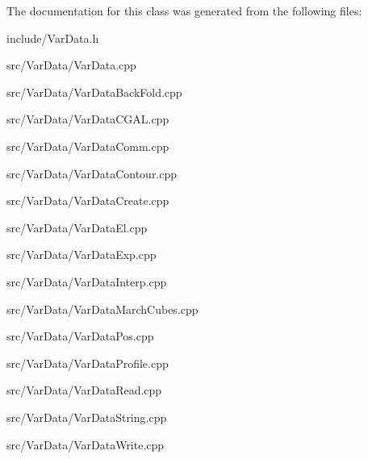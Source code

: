 The documentation for this class was generated from the following files\+:\begin{DoxyCompactItemize}
\item 
include/Var\+Data.\+h\item 
src/\+Var\+Data/Var\+Data.\+cpp\item 
src/\+Var\+Data/Var\+Data\+Back\+Fold.\+cpp\item 
src/\+Var\+Data/Var\+Data\+C\+G\+A\+L.\+cpp\item 
src/\+Var\+Data/Var\+Data\+Comm.\+cpp\item 
src/\+Var\+Data/Var\+Data\+Contour.\+cpp\item 
src/\+Var\+Data/Var\+Data\+Create.\+cpp\item 
src/\+Var\+Data/Var\+Data\+El.\+cpp\item 
src/\+Var\+Data/Var\+Data\+Exp.\+cpp\item 
src/\+Var\+Data/Var\+Data\+Interp.\+cpp\item 
src/\+Var\+Data/Var\+Data\+March\+Cubes.\+cpp\item 
src/\+Var\+Data/Var\+Data\+Pos.\+cpp\item 
src/\+Var\+Data/Var\+Data\+Profile.\+cpp\item 
src/\+Var\+Data/Var\+Data\+Read.\+cpp\item 
src/\+Var\+Data/Var\+Data\+String.\+cpp\item 
src/\+Var\+Data/Var\+Data\+Write.\+cpp\end{DoxyCompactItemize}
